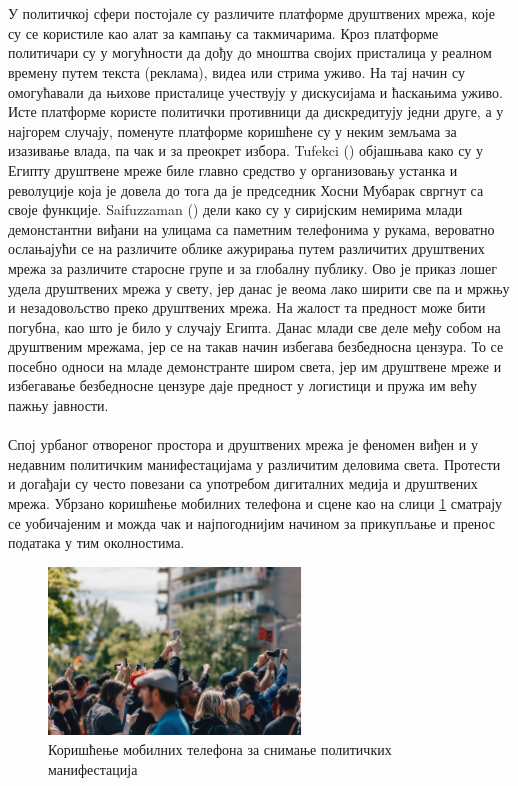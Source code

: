 \documentclass{article}
\begin{document}
\\\\
У политичкој сфери постојале су различите платформе друштвених мрежа, које су се користиле као алат за кампању са такмичарима. Кроз платформе политичари су у могућности да дођу до мноштва својих присталица у реалном времену путем текста (реклама), видеа или стрима уживо. На тај начин су омогућавали да њихове присталице учествују у дискусијама и ћаскањима уживо. 
\\
Исте платформе користе политички противници да дискредитују једни друге, а у најгорем случају, поменуте платформе коришћене су у неким земљама за изазивање влада, па чак и за преокрет избора. Tufekci (\cite{tu_2014}) објашњава како су у Египту друштвене мреже биле главно средство у организовању устанка и револуције која је довела до тога да је председник Хосни Мубарак свргнут са своје функције. Saifuzzaman (\cite{s_2017}) дели како су у сиријским немирима млади демонстантни виђани на улицама са паметним телефонима у рукама, вероватно ослањајући се на различите облике ажурирања путем различитих друштвених мрежа за различите старосне групе и за глобалну публику. Ово је приказ лошег удела друштвених мрежа у свету, јер данас је веома лако ширити све па и мржњу и незадовољство преко друштвених мрежа. На жалост та предност може бити погубна, као што је било у случају Египта. Данас млади све деле међу собом на друштвеним мрежама, јер се на такав начин избегава безбедносна цензура. То се посебно односи на младе демонстранте широм света, јер им друштвене мреже и избегавање безбедносне цензуре даје предност у логистици и пружа им већу пажњу јавности.
\\\\
Спој урбаног отвореног простора и друштвених мрежа је феномен виђен и у недавним политичким манифестацијама у различитим деловима света. Протести и догађаји су често повезани са употребом дигиталних медија и друштвених мрежа. Убрзано коришћење мобилних телефона и сцене као на слици \ref{fig:mreze2} сматрају се уобичајеним и можда чак и најпогоднијим начином за прикупљање и пренос података у тим околностима.\\
\begin{figure}[h!]
\centering
\includegraphics[width=0.6\textwidth]{slike/mreze2.png}
\caption{\label{fig:mreze2}Коришћење мобилних телефона за снимање политичких манифестација}
\end{figure}
\end{document}
